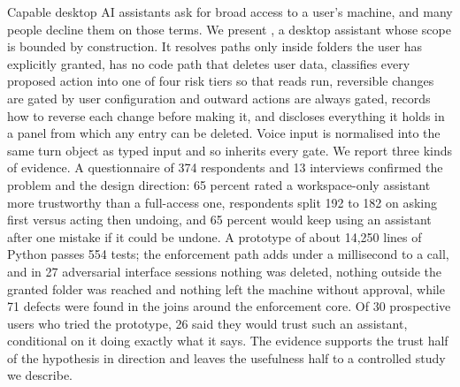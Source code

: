 Capable desktop AI assistants ask for broad access to a user's machine, and many people decline them on those terms. We present \sys{}, a desktop assistant whose scope is bounded by construction. It resolves paths only inside folders the user has explicitly granted, has no code path that deletes user data, classifies every proposed action into one of four risk tiers so that reads run, reversible changes are gated by user configuration and outward actions are always gated, records how to reverse each change before making it, and discloses everything it holds in a panel from which any entry can be deleted. Voice input is normalised into the same turn object as typed input and so inherits every gate. We report three kinds of evidence. A questionnaire of 374 respondents and 13 interviews confirmed the problem and the design direction: 65 percent rated a workspace-only assistant more trustworthy than a full-access one, respondents split 192 to 182 on asking first versus acting then undoing, and 65 percent would keep using an assistant after one mistake if it could be undone. A prototype of about 14,250 lines of Python passes 554 tests; the enforcement path adds under a millisecond to a call, and in 27 adversarial interface sessions nothing was deleted, nothing outside the granted folder was reached and nothing left the machine without approval, while 71 defects were found in the joins around the enforcement core. Of 30 prospective users who tried the prototype, 26 said they would trust such an assistant, conditional on it doing exactly what it says. The evidence supports the trust half of the hypothesis in direction and leaves the usefulness half to a controlled study we describe.
